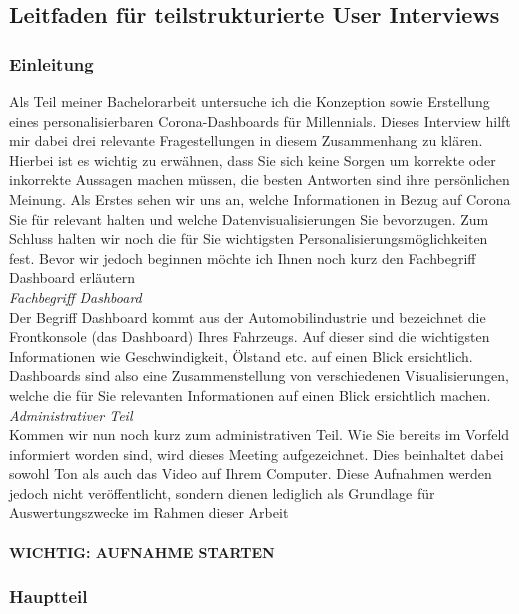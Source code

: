\documentclass[12pt, oneside]{article}
\begin{document}
\subsection*{Leitfaden für teilstrukturierte User Interviews}

\subsubsection*{Einleitung}
Als Teil meiner Bachelorarbeit untersuche ich die Konzeption sowie Erstellung eines personalisierbaren Corona-Dashboards für Millennials. Dieses Interview hilft mir dabei drei relevante Fragestellungen in diesem Zusammenhang zu klären. Hierbei ist es wichtig zu erwähnen, dass Sie sich keine Sorgen um korrekte oder inkorrekte Aussagen machen müssen, die besten Antworten sind ihre persönlichen Meinung. Als Erstes sehen wir uns an, welche Informationen in Bezug auf Corona Sie für relevant halten und welche Datenvisualisierungen Sie bevorzugen. Zum Schluss halten wir noch die für Sie wichtigsten Personalisierungsmöglichkeiten fest. Bevor wir jedoch beginnen möchte ich Ihnen noch kurz den Fachbegriff Dashboard erläutern
\\

\textit{Fachbegriff Dashboard}
\\
Der Begriff Dashboard kommt aus der Automobilindustrie und bezeichnet die Frontkonsole (das Dashboard) Ihres Fahrzeugs. Auf dieser sind die wichtigsten Informationen wie Geschwindigkeit, Ölstand etc. auf einen Blick ersichtlich. Dashboards sind also eine Zusammenstellung von verschiedenen Visualisierungen, welche die für Sie relevanten Informationen auf einen Blick ersichtlich machen.\\


\textit{Administrativer Teil}
\\
Kommen wir nun noch kurz zum administrativen Teil. Wie Sie bereits im Vorfeld informiert worden sind, wird dieses Meeting aufgezeichnet. Dies beinhaltet dabei sowohl Ton als auch das Video auf Ihrem Computer. Diese Aufnahmen werden jedoch nicht veröffentlicht, sondern dienen lediglich als Grundlage für Auswertungszwecke im Rahmen dieser Arbeit\\\\
\textbf{WICHTIG: AUFNAHME STARTEN}


\clearpage
\subsubsection*{Hauptteil}
\end{document}
